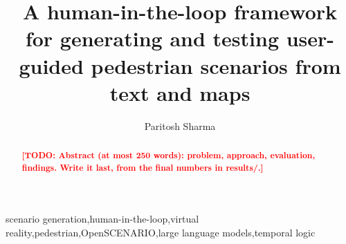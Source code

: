 \documentclass[preprint,12pt]{elsarticle}
\newif\ifanon
\newcommand{\todo}[1]{\textcolor{red}{\textbf{[TODO: #1]}}}
\begin{document}
\begin{frontmatter}

\title{A human-in-the-loop framework for generating and testing user-guided pedestrian scenarios from text and maps}

\ifanon
\else
  \author{Paritosh Sharma}
\fi

\begin{abstract}
\todo{Abstract (at most 250 words): problem, approach, evaluation, findings. Write it last, from the final numbers in results/.}
\end{abstract}


\begin{keyword}
scenario generation\sep human-in-the-loop\sep virtual reality\sep pedestrian\sep OpenSCENARIO\sep large language models\sep temporal logic
\end{keyword}

\end{frontmatter}

\end{document}
